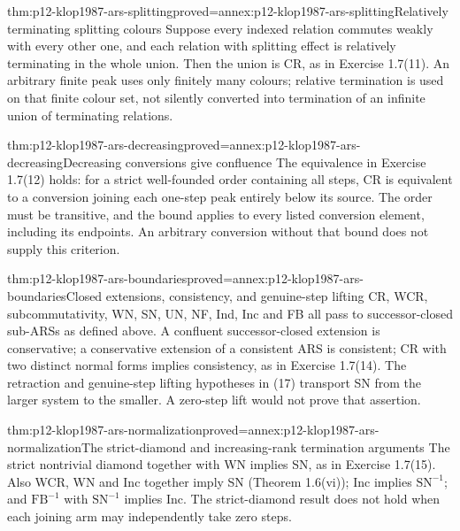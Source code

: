 \begin{hbtheorem}{thm:p12-klop1987-ars-splitting}{proved=annex:p12-klop1987-ars-splitting}{Relatively terminating splitting colours}
Suppose every indexed relation commutes weakly with every other one,
and each relation with splitting effect is relatively terminating in
the whole union. Then the union is CR, as in Exercise 1.7(11).
An arbitrary finite peak uses only finitely many colours; relative
termination is used on that finite colour set, not silently converted
into termination of an infinite union of terminating relations.
\end{hbtheorem}

\begin{hbtheorem}{thm:p12-klop1987-ars-decreasing}{proved=annex:p12-klop1987-ars-decreasing}{Decreasing conversions give confluence}
The equivalence in Exercise 1.7(12) holds: for a strict well-founded
order containing all steps, CR is equivalent to a conversion joining
each one-step peak entirely below its source. The order must be
transitive, and the bound applies to every listed conversion element,
including its endpoints. An arbitrary conversion without that bound
does not supply this criterion.
\end{hbtheorem}

\begin{hbtheorem}{thm:p12-klop1987-ars-boundaries}{proved=annex:p12-klop1987-ars-boundaries}{Closed extensions, consistency, and genuine-step lifting}
CR, WCR, subcommutativity, WN, SN, UN, NF, Ind, Inc and FB all pass
to successor-closed sub-ARSs as defined above.
A confluent successor-closed extension is conservative; a conservative
extension of a consistent ARS is consistent; CR with two distinct normal
forms implies consistency, as in Exercise 1.7(14). The retraction and
genuine-step lifting hypotheses in (17) transport SN from the larger
system to the smaller. A zero-step lift would not prove that assertion.
\end{hbtheorem}

\begin{hbtheorem}{thm:p12-klop1987-ars-normalization}{proved=annex:p12-klop1987-ars-normalization}{The strict-diamond and increasing-rank termination arguments}
The strict nontrivial diamond together with WN implies SN, as in
Exercise 1.7(15). Also WCR, WN and Inc together imply SN (Theorem
1.6(vi)); Inc implies \(\mathrm{SN}^{-1}\); and
\(\mathrm{FB}^{-1}\) with \(\mathrm{SN}^{-1}\) implies Inc.
The strict-diamond result does not hold when each joining arm may
independently take zero steps.
\end{hbtheorem}

